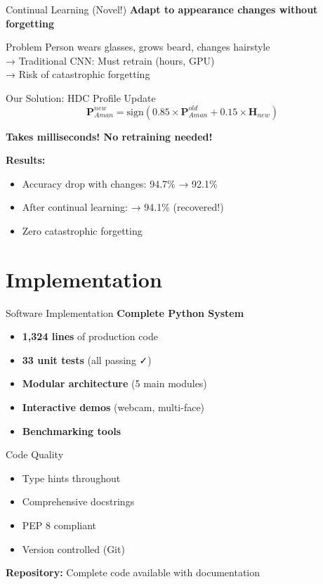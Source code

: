 \documentclass[aspectratio=169]{beamer}
\begin{document}
\begin{frame}{Continual Learning (Novel!)}
\textbf{Adapt to appearance changes without forgetting}

\begin{block}{Problem}
Person wears glasses, grows beard, changes hairstyle\\
→ Traditional CNN: Must retrain (hours, GPU)\\
→ Risk of catastrophic forgetting
\end{block}

\begin{block}{Our Solution: HDC Profile Update}
\begin{equation*}
\mathbf{P}_{Aman}^{new} = \text{sign}(0.85 \times \mathbf{P}_{Aman}^{old} + 0.15 \times \mathbf{H}_{new})
\end{equation*}

\textbf{Takes milliseconds! No retraining needed!}
\end{block}

\textbf{Results:}
\begin{itemize}
    \item Accuracy drop with changes: 94.7\% → 92.1\%
    \item After continual learning: → 94.1\% (recovered!)
    \item Zero catastrophic forgetting
\end{itemize}
\end{frame}

\section{Implementation}

\begin{frame}{Software Implementation}
\textbf{Complete Python System}

\begin{itemize}
    \item \textbf{1,324 lines} of production code
    \item \textbf{33 unit tests} (all passing ✓)
    \item \textbf{Modular architecture} (5 main modules)
    \item \textbf{Interactive demos} (webcam, multi-face)
    \item \textbf{Benchmarking tools}
\end{itemize}

\begin{block}{Code Quality}
\begin{itemize}
    \item Type hints throughout
    \item Comprehensive docstrings
    \item PEP 8 compliant
    \item Version controlled (Git)
\end{itemize}
\end{block}

\textbf{Repository:} Complete code available with documentation
\end{frame}
\end{document}

